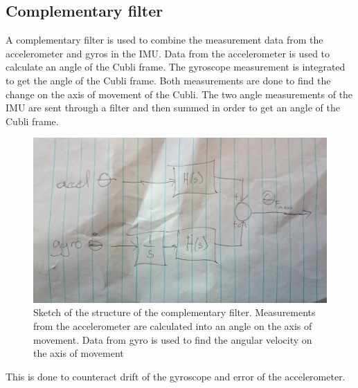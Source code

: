 \subsection{Complementary filter}
A complementary filter is used to combine the measurement data from the accelerometer and gyros in the IMU. 
Data from the accelerometer is used to calculate an angle of the Cubli frame.
The gyroscope measurement is integrated to get the angle of the Cubli frame. Both measurements are done to find the change on the axis of movement of the Cubli.
The two angle measurements of the IMU are sent through a filter and then summed in order to get an angle of the Cubli frame. 
\begin{figure}[H] 
	\centering
	\includegraphics[scale=0.08]{figures/tempComplementaryFilter}
	\caption{Sketch of the structure of the complementary filter. Measurements from the accelerometer are calculated into an angle on the axis of movement. Data from gyro is used to find the angular velocity on the axis of movement}
	\label{blockComplementaryFilter}
\end{figure}
This is done to counteract drift of the gyroscope and error of the accelerometer. 